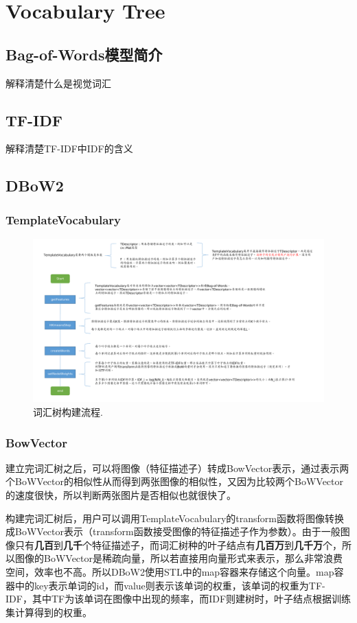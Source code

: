 
\chapter{Vocabulary Tree}
\section{Bag-of-Words模型简介}
解释清楚什么是视觉词汇
\section{TF-IDF}
解释清楚TF-IDF中IDF的含义


\section{DBoW2}
\subsection{TemplateVocabulary}
\begin{figure}[h]%
	\centering  %
	\includegraphics[width=1.0\linewidth]{image/DBoW2/DBoW2.pdf}  %
	\caption{词汇树构建流程.}  %
\end{figure}


\subsection{BowVector}
建立完词汇树之后，可以将图像（特征描述子）转成BowVector表示，通过表示两个BoWVector的相似性从而得到两张图像的相似性，又因为比较两个BoWVector的速度很快，所以判断两张图片是否相似也就很快了。

构建完词汇树后，用户可以调用TemplateVocabulary的transform函数将图像转换成BoWVector表示（transform函数接受图像的特征描述子作为参数）。由于一般图像只有\textbf{几百}到\textbf{几千}个特征描述子，而词汇树种的叶子结点有\textbf{几百万}到\textbf{几千万}个，所以图像的BoWVector是稀疏向量，所以若直接用向量形式来表示，那么非常浪费空间，效率也不高。所以DBoW2使用STL中的map容器来存储这个向量。map容器中的key表示单词的id，而value则表示该单词的权重，该单词的权重为TF-IDF，其中TF为该单词在图像中出现的频率，而IDF则建树时，叶子结点根据训练集计算得到的权重。


